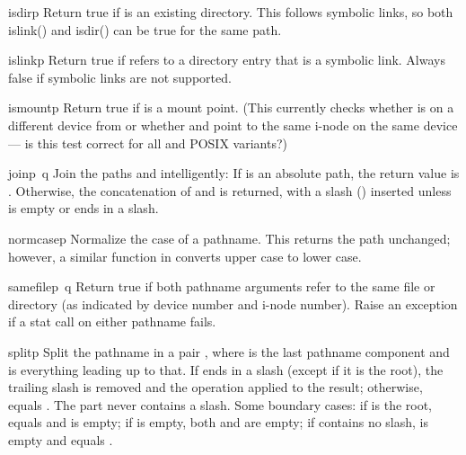 \begin{funcdesc}{isdir}{p}
Return true if  is an existing directory.  This follows
symbolic links, so both islink() and isdir() can be true for the same
path.
\end{funcdesc}

\begin{funcdesc}{islink}{p}
Return true if
refers to a directory entry that is a symbolic link.
Always false if symbolic links are not supported.
\end{funcdesc}

\begin{funcdesc}{ismount}{p}
Return true if  is a mount point.  (This currently checks whether
 is on a different device from  or whether
 and  point to the same i-node on the same
device --- is this test correct for all \UNIX{} and POSIX variants?)
\end{funcdesc}

\begin{funcdesc}{join}{p\, q}
Join the paths
and
 intelligently:
If
is an absolute path, the return value is
.
Otherwise, the concatenation of
and
is returned, with a slash () inserted unless
is empty or ends in a slash.
\end{funcdesc}

\begin{funcdesc}{normcase}{p}
Normalize the case of a pathname.  This returns the path unchanged;
however, a similar function in  converts upper case to
lower case.
\end{funcdesc}

\begin{funcdesc}{samefile}{p\, q}
Return true if both pathname arguments refer to the same file or directory
(as indicated by device number and i-node number).
Raise an exception if a stat call on either pathname fails.
\end{funcdesc}

\begin{funcdesc}{split}{p}
Split the pathname  in a pair , where
 is the last pathname component and  is
everything leading up to that.  If  ends in a slash (except if
it is the root), the trailing slash is removed and the operation
applied to the result; otherwise,  equals
.  The  part never contains a slash.  Some boundary
cases: if  is the root,  equals  and
 is empty; if  is empty, both  and
 are empty; if  contains no slash,  is
empty and  equals .
\end{funcdesc}

